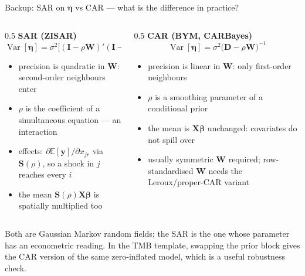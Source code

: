 \documentclass[10pt,aspectratio=169]{beamer}
\newcommand{\E}{\mathbb{E}}
\newcommand{\bW}{\mathbf{W}}
\newcommand{\bX}{\mathbf{X}}
\newcommand{\by}{\mathbf{y}}
\newcommand{\bI}{\mathbf{I}}
\newcommand{\bS}{\mathbf{S}}
\newcommand{\bbeta}{\boldsymbol{\beta}}
\DeclareMathOperator{\Var}{Var}
\begin{document}
\begin{frame}{Backup: SAR on $\boldsymbol\eta$ vs CAR --- what is the difference in practice?}
  \small
  \begin{columns}[T]
    \begin{column}{0.5\textwidth}
      \textbf{SAR (ZISAR)}
      \[
        \Var[\boldsymbol\eta] = \sigma^2\bigl[(\bI-\rho\bW)'(\bI-\rho\bW)\bigr]^{-1}
      \]
      \begin{itemize}
        \item precision is quadratic in $\bW$: second-order neighbours enter
        \item $\rho$ is the coefficient of a simultaneous equation --- an interaction
        \item effects: $\partial\E[\by]/\partial x_{jr}$ via $\bS(\rho)$, so a shock in $j$ reaches every $i$
        \item the mean $\bS(\rho)\bX\bbeta$ is spatially multiplied too
      \end{itemize}
    \end{column}
    \begin{column}{0.5\textwidth}
      \textbf{CAR (BYM, CARBayes)}
      \[
        \Var[\boldsymbol\eta] = \sigma^2\bigl(\mathbf D-\rho\bW\bigr)^{-1}
      \]
      \begin{itemize}
        \item precision is linear in $\bW$: only first-order neighbours
        \item $\rho$ is a smoothing parameter of a conditional prior
        \item the mean is $\bX\bbeta$ unchanged: covariates do not spill over
        \item usually symmetric $\bW$ required; row-standardised $\bW$ needs the Leroux/proper-CAR variant
      \end{itemize}
    \end{column}
  \end{columns}
  \vspace{0.5em}
  {\small Both are Gaussian Markov random fields; the SAR is the one whose parameter has an econometric reading. In the TMB template, swapping the prior block gives the CAR version of the same zero-inflated model, which is a useful robustness check.}
\end{frame}
\end{document}
